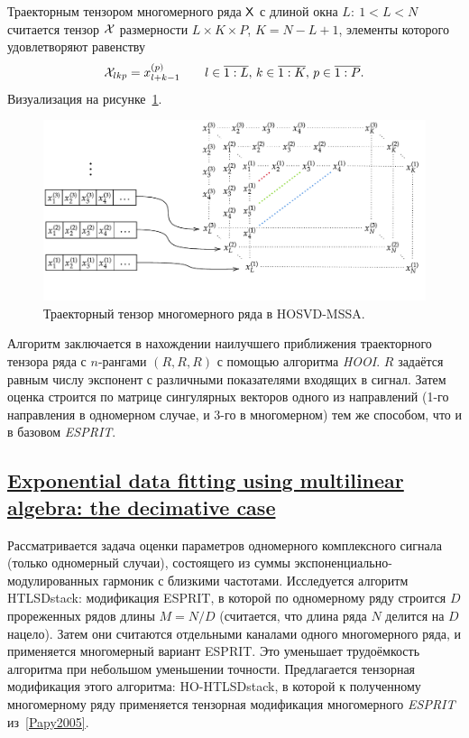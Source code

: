 \documentclass[12pt]{article}
\theoremstyle{plain}
\theoremstyle{definition}
\theoremstyle{remark}
\newcommand{\HOOI}{\emph{HOOI}}
\newcommand{\ESPRIT}{\emph{ESPRIT}}
\begin{document}
Траекторным тензором многомерного ряда $\mathsf{X}$ с длиной окна $L:\: 1< L
< N$ считается тензор $\mathcal{X}$ размерности ${L \times K \times P}$,
${K = N - L + 1}$, элементы которого удовлетворяют равенству
\[
  \mathcal{X}_{lkp}=x_{l+k-1}^{(p)} \qquad l \in \overline{1:L},\, k \in
  \overline{1:K},\, p \in \overline{1:P}.
\]
Визуализация на рисунке~\ref{fig:traj-hosvd-mssa}.
\begin{figure}[!ht]
  \centering
  \includegraphics[width=\textwidth]{mssa_injection_new.pdf}
  \caption{Траекторный тензор многомерного ряда в HOSVD-MSSA.}
  \label{fig:traj-hosvd-mssa}
\end{figure}

Алгоритм заключается в нахождении наилучшего приближения траекторного
тензора ряда с $n$-рангами $(R, R, R)$ с помощью
алгоритма \HOOI{}.
$R$ задаётся равным числу экспонент с различными показателями входящих в сигнал.
Затем оценка строится по матрице сингулярных векторов одного из
направлений (1-го направления в одномерном случае, и 3-го в
многомерном) тем же способом, что и в базовом \ESPRIT{}.

\subsection{\href{https://doi.org/10.1002/cem.1212}{Exponential data
fitting using multilinear algebra: the decima\-tive case}}\label{Papy2009}
Рассматривается задача оценки параметров
одномерного комплексного сигнала (только одномерный случаи),
состоящего из суммы экспоненциально-модулированных гармоник с
близкими частотами.
Исследуется алгоритм HTLSDstack: модификация ESPRIT, в которой
по одномерному ряду строится $D$ прореженных рядов длины $M = N / D$ (считается,
что длина ряда $N$ делится на $D$ нацело).
Затем они считаются отдельными каналами одного многомерного ряда, и применяется
многомерный вариант ESPRIT.
Это уменьшает трудоёмкость алгоритма при небольшом уменьшении точности.
Предлагается тензорная модификация этого алгоритма: HO-HTLSDstack, в которой
к полученному многомерному ряду применяется тензорная модификация
многомерного \ESPRIT{} из~\ref{Papy2005}.
\end{document}
